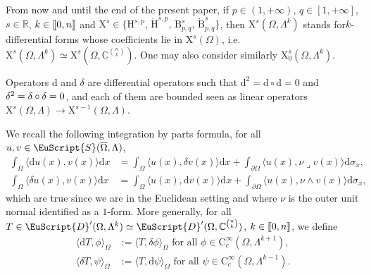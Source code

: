 \documentclass[10pt]{amsart}
\theoremstyle{definition}\newtheorem{defi}[theo]{Definition}\newtheorem{rema}[theo]{Remark}\newtheorem{exam}[theo]{Example}\newtheorem{exem}[theo]{Example}\newtheorem{nota}[theo]{Notation}
\newcommand{\bbR}{\mathbb{R}}
\newcommand{\bbC}{\mathbb{C}}
\newcommand{\rmH}{\mathrm{H}}%
\newcommand{\rmB}{\mathrm{B}}
\newcommand{\rmd}{\mathrm{d}}
\newcommand{\rmC}{\mathrm{C}}
\newcommand{\rmX}{\mathrm{X}}
\newcommand{\eus}{\EuScript}
\newcommand{\llbracket}{\mathopen{[\mkern -2.7mu[}}
\newcommand{\rrbracket}{\mathclose{]\mkern -2.7mu]}}
\newcommand{\llb}{\llbracket}
\newcommand{\rrb}{\rrbracket}
\begin{document}
From now and until the end of the present paper, if $p\in(1,+\infty)$, $q\in[1,+\infty]$, $s\in\bbR$, $k\in\llb 0,n \rrb$ and $\rmX ^s\in\{\rmH^{s,p},\, \dot{\rmH}^{s,p},\, \rmB^{s}_{p,q},\, \dot{\rmB}^{s}_{p,q}\}$, then $\rmX^s(\Omega,\Lambda^k)$ stands for\linebreak $k$-differential forms whose coefficients lie in $\rmX^s(\Omega)$, i.e. $\rmX^s(\Omega,\Lambda^k)\simeq \rmX^s(\Omega,\bbC^{\binom{n}{k}})$. One may also consider similarly $\rmX^s_0(\Omega,\Lambda^k)$.

Operators $\rmd$ and ${\delta}$ are differential operators such that $\rmd^2 = \rmd \circ \rmd = 0$ and ${\delta}^2 = {\delta} \circ {\delta}\linebreak = 0$, and each of them are bounded seen as linear operators $\rmX^s(\Omega,\Lambda)\longrightarrow \rmX^{s-1}(\Omega,\Lambda)$.

We recall the following integration by parts formula, for all $u,v\in \eus{S}({\overline{\Omega}},\Lambda)$,
\begin{align}
\int_{\Omega} \langle \rmd u(x), v(x)\rangle \rmd x &= \int_{\Omega} \langle u(x), {\delta} v(x)\rangle \rmd x + \int_{\partial\Omega} \langle u(x), \nu\lrcorner v(x)\rangle \rmd\sigma_x,\label{eq:IntbyParts1}
\\
\int_{\Omega} \langle {\delta} u(x), v(x)\rangle \rmd x &= \int_{\Omega} \langle u(x), \rmd v(x)\rangle \rmd x + \int_{\partial\Omega} \langle u(x), \nu\wedge v(x)\rangle \rmd\sigma_x,\label{eq:IntbyParts2}
\end{align}
which are true since we are in the Euclidean setting and where $\nu$ is the outer unit normal identified as a $1$-form. More generally, for all $T\in \eus{D}'(\Omega,\Lambda^k)\simeq \eus{D}'(\Omega,\bbC^{\binom{n}{k}})$, $k\in\llb 0,n\rrb$, we define
\begin{align*}
\big\langle \rmd T, \phi \big\rangle_{\Omega} &:= \big\langle T, {\delta}\phi \big\rangle_{\Omega} \text{ for all }\phi \in \rmC_c^\infty
\left(\Omega,\Lambda^{k+1}\right),
\\
\big\langle {\delta}T, \psi \big\rangle_{\Omega} &:= \big\langle T,\rmd\psi \big\rangle_{\Omega} \text{ for all }\psi \in \rmC_c^\infty
\left(\Omega,\Lambda^{k-1}\right).
\end{align*}
\end{document}
